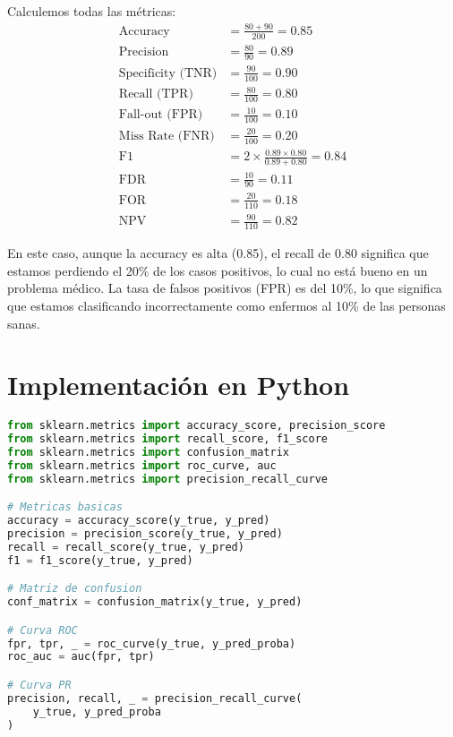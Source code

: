 \documentclass[12pt]{article}
\begin{document}
Calculemos todas las métricas:
\begin{align*}
\text{Accuracy} &= \frac{80 + 90}{200} = 0.85 \\
\text{Precision} &= \frac{80}{90} = 0.89 \\
\text{Specificity (TNR)} &= \frac{90}{100} = 0.90 \\
\text{Recall (TPR)} &= \frac{80}{100} = 0.80 \\
\text{Fall-out (FPR)} &= \frac{10}{100} = 0.10 \\
\text{Miss Rate (FNR)} &= \frac{20}{100} = 0.20 \\
\text{F1} &= 2 \times \frac{0.89 \times 0.80}{0.89 + 0.80} = 0.84 \\
\text{FDR} &= \frac{10}{90} = 0.11 \\
\text{FOR} &= \frac{20}{110} = 0.18 \\
\text{NPV} &= \frac{90}{110} = 0.82
\end{align*}

En este caso, aunque la accuracy es alta (0.85), el recall de 0.80 significa que estamos perdiendo el 20\% de los casos positivos, lo cual no está bueno en un problema médico. La tasa de falsos positivos (FPR) es del 10\%, lo que significa que estamos clasificando incorrectamente como enfermos al 10\% de las personas sanas.

\section{Implementación en Python}

\begin{lstlisting}[language=Python]
from sklearn.metrics import accuracy_score, precision_score
from sklearn.metrics import recall_score, f1_score
from sklearn.metrics import confusion_matrix
from sklearn.metrics import roc_curve, auc
from sklearn.metrics import precision_recall_curve

# Metricas basicas
accuracy = accuracy_score(y_true, y_pred)
precision = precision_score(y_true, y_pred)
recall = recall_score(y_true, y_pred)
f1 = f1_score(y_true, y_pred)

# Matriz de confusion
conf_matrix = confusion_matrix(y_true, y_pred)

# Curva ROC
fpr, tpr, _ = roc_curve(y_true, y_pred_proba)
roc_auc = auc(fpr, tpr)

# Curva PR
precision, recall, _ = precision_recall_curve(
    y_true, y_pred_proba
)
\end{lstlisting}
\end{document}
